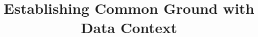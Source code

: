 \documentclass{sig-alternate}
\begin{document}
\newcommand{\smallitem}[1]{\vspace{0.5em}\noindent\textbf{#1}}
\newcommand{\smallitembot}{\vspace{0.5em}\noindent}


\newcommand{\jmh}[1]{{\textcolor{red}{[[#1 -- jmh]]}}}
\newcommand{\joey}[1]{{\textcolor{cyan}{[[#1 -- jeg]]}}}
\newcommand{\msd}[1]{{\textcolor{green}{[[#1 -- msd]]}}}
\newcommand{\akon}[1]{{\textcolor{orange}{[[#1 -- akon]]}}}
\newcommand{\vikram}[1]{{\textcolor{blue}{[[#1 --vikram]]}}}

\newcommand{\versiongraph}{version graph\xspace}
\newcommand{\modelgraph}{model graph\xspace}
\newcommand{\lineagegraph}{lineage graph\xspace}
\newcommand{\VersionGraph}{Version Graph\xspace}
\newcommand{\ModelGraph}{Model Graph\xspace}
\newcommand{\LineageGraph}{Lineage Graph\xspace}

\newcommand{\version}{\kw{Version}\xspace}
\newcommand{\richversion}{\kw{RichVersion}\xspace}
\newcommand{\itemground}{\kw{Item}\xspace}
\newcommand{\GroundItem}{\kw{Item}\xspace}
\newcommand{\node}{\kw{Node}\xspace}
\newcommand{\edge}{\kw{Edge}\xspace}
\newcommand{\structure}{\kw{Structure}\xspace}
\newcommand{\graph}{\kw{Graph}\xspace}
\newcommand{\TVID}{\kw{TVID}\xspace}
\newcommand{\gtag}{\kw{Tag}\xspace}
\newcommand{\uri}{\kw{URI}\xspace}

\newcommand{\groundwire}{GroundWire\xspace}

\newcommand{\kw}[1]{{\small\texttt{#1}}}
\newcommand{\lilemail}[1]{\email{\small #1}}



\title{Establishing Common Ground with Data Context}
\end{document}
